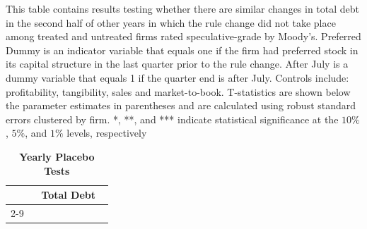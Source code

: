 \documentclass[a4paper, 12pt]{article}
\begin{document}
\begin{landscape}
\pagestyle{empty}
\begin{table}[htbp]
\caption{\textbf{Yearly Placebo Tests}} \label{table_placebo_all}
\begin{singlespace}
\begin{small}

This table contains results testing whether there are similar changes in total debt in the second half of other years in which the rule change did not take place among treated and untreated firms rated speculative-grade by Moody's. Preferred Dummy is an indicator variable that equals one if the firm had preferred stock in its capital structure in the last quarter prior to the rule change. After July is a dummy variable that equals 1 if the quarter end is after July. Controls include: profitability, tangibility, sales and market-to-book. T-statistics are shown below the parameter estimates in parentheses and are calculated using robust standard errors clustered by firm. *, **, and *** indicate statistical significance at the $10\%$, $5\%$, and $1\%$ levels, respectively
\end{small}
\end{singlespace}
\vspace{3mm}

\small
  \centering
\begin{tabular}{lcccccccc}
    \toprule
    \textbf{} &
      \multicolumn{8}{c}{\textbf{Total Debt}}
      \\
                \cline{2-9}




    \bottomrule
    \end{tabular}
\end{table}
\end{landscape}
\clearpage
\newpage
\end{document}
